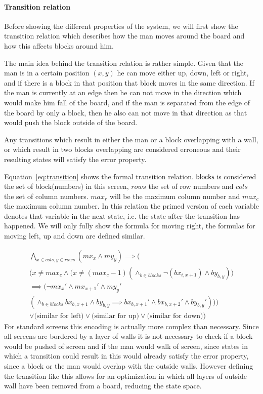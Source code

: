 \paragraph{Transition relation}
Before showing the different properties of the system, we will first show the 
transition relation which describes how the man moves around the board and how
this affects blocks around him.

The main idea behind the transition relation is rather simple. Given that the 
man is in a certain position $(x,y)$ he can move either up, down, left or right,
and if there is a block in that position that block moves in the same direction.
If the man is currently at an edge then he can not move in the direction which 
would make him fall of the board, and if the man is separated from the edge of 
the board by only a block, then he also can not move in that direction as that
would push the block outside of the board.

Any transitions which result in either the man or a block overlapping with a 
wall, or which result in two blocks overlapping are considered erroneous and
their resulting states will satisfy the error property.

Equation~\ref{eq:transition} shows the formal transition relation. 
$\mathsf{blocks}$ is considered the set of block(numbers) in this screen, $rows$ 
the set of row numbers and $cols$ the set of column numbers. $max_r$ will be
the maximum column number and $max_c$ the maximum column number. In this 
relation the primed version of each variable denotes that variable in the next
state, i.e. the state after the transition has happened.
We will only 
fully show the formula for moving right, the formulas for moving left, up and
down are defined similar. 

\begin{multline}\label{eq:transition}
	\bigwedge_{x \in cols, y \in rows} (mx_x \wedge my_y) \implies \bigg(\\  
		\Big( x \neq max_c \wedge \big(x \neq (max_c-1) 
			(\wedge_{b \in blocks} \neg (bx_{i,x+1}) \wedge by_{b,y})\big)\\  
		\implies \big( \neg mx_{x}' \wedge mx_{x+1}' \wedge my_y' \\  
			(\wedge_{b \in blocks} bx_{b,x+1} \wedge by_{b,y} \implies
				bx_{b,x+1}' \wedge bx_{b,x+2}' \wedge by_{b,y}' )\big) \Big)\\  
		\vee \Big(\text{similar for left}\Big) 
			\vee \Big(\text{similar for up}\Big)
			\vee \Big(\text{similar for down}\Big) \bigg)
\end{multline}
For standard screens this encoding is actually more complex than necessary. 
Since all screens are bordered by a layer of walls it is not necessary to check
if a block would be pushed of screen and if the man would walk of screen, since
states in which a transition could result in this would already satisfy the 
error property, since a block or the man would overlap with the outside walls. 
However defining the transition like this allows for an optimization in which 
all layers of 
outside wall have been removed from a board, reducing the state space.

